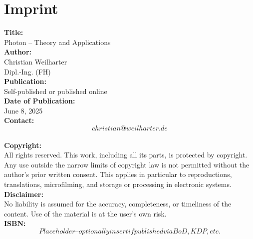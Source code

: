 \chapter*{Imprint}
\label{chap:imp}

\begin{flushleft}
	
	\textbf{Title:} \\
	Photon – Theory and Applications \\[1em]
	
	\textbf{Author:} \\
	Christian Weilharter \\
	Dipl.-Ing. (FH) \\[1em]
	
	\textbf{Publication:} \\
	Self-published or published online \\[1em]
	
	\textbf{Date of Publication:} \\
	June 8, 2025 \\[1em]
	
	\textbf{Contact:} \\
	\[christian@weilharter.de\] \\[1em]
	
	\textbf{Copyright:} \\
	All rights reserved. This work, including all its parts, is protected by copyright. Any use outside the narrow limits of copyright law is not permitted without the author's prior written consent. This applies in particular to reproductions, translations, microfilming, and storage or processing in electronic systems. \\[1em]
	
	\textbf{Disclaimer:} \\
	No liability is assumed for the accuracy, completeness, or timeliness of the content. Use of the material is at the user’s own risk. \\[1em]
	
	\textbf{ISBN:} \\
	\[Placeholder – optionally insert if published via BoD, KDP, etc.\]
	
\end{flushleft}

